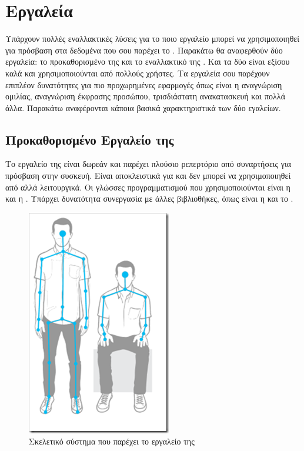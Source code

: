 \section{Εργαλεία}

Υπάρχουν πολλές εναλλακτικές λύσεις για το ποιο εργαλείο μπορεί να χρησιμοποιηθεί για πρόσβαση στα δεδομένα που σου παρέχει το . Παρακάτω θα αναφερθούν δύο εργαλεία: το προκαθορισμένο  της  και το εναλλακτικό της . Και τα δύο είναι εξίσου καλά και χρησιμοποιούνται από πολλούς χρήστες. Τα εργαλεία σου παρέχουν επιπλέον δυνατότητες για πιο προχωρημένες εφαρμογές όπως είναι η αναγνώριση ομιλίας, αναγνώριση έκφρασης προσώπου, τρισδιάστατη ανακατασκευή και πολλά άλλα. Παρακάτω αναφέρονται κάποια βασικά χαρακτηριστικά των δύο εγαλείων.

\subsection{\texorpdfstring{Προκαθορισμένο Εργαλείο της }{}}

Το εργαλείο της  είναι δωρεάν και παρέχει πλούσιο ρεπερτόριο από συναρτήσεις για πρόσβαση στην συσκευή. Είναι αποκλειστικά για  και δεν μπορεί να χρησιμοποιηθεί από αλλά λειτουργικά. Οι γλώσσες προγραμματισμού που χρησιμοποιούνται είναι η  και η . Υπάρχει δυνατότητα συνεργασία με άλλες βιβλιοθήκες, όπως είναι η  και το .

\begin{figure}[H]
    \centering
    \includegraphics[height=.30\textheight, keepaspectratio]{fig/microsoft-skeleton.png}
    \caption{Σκελετικό σύστημα που παρέχει το εργαλείο της \protect\footnotemark}
    \label{fig:microsoft-sdk-skeleton}
\end{figure}


